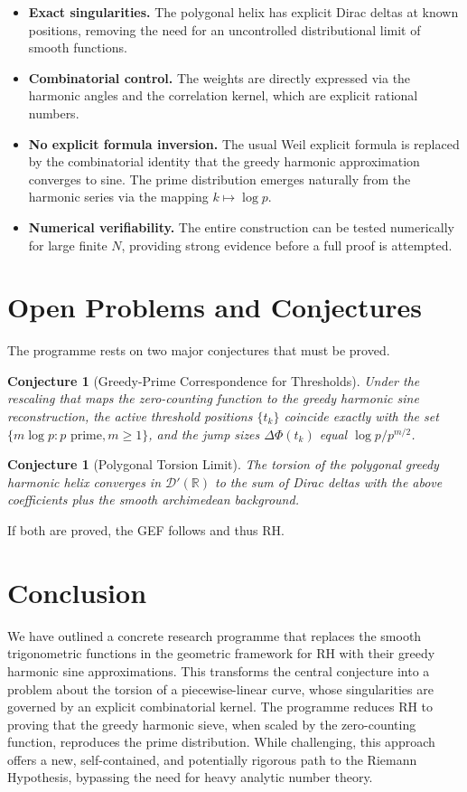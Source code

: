 \documentclass[12pt,a4paper]{article}
\newtheorem{conjecture}[theorem]{Conjecture}
\newcommand{\R}{\mathbb{R}}
\newcommand{\dist}{\mathcal{D}'}
\begin{document}
\begin{itemize}
\item \textbf{Exact singularities.}  The polygonal helix has explicit Dirac deltas at known positions, removing the need for an uncontrolled distributional limit of smooth functions.
\item \textbf{Combinatorial control.}  The weights are directly expressed via the harmonic angles and the correlation kernel, which are explicit rational numbers.
\item \textbf{No explicit formula inversion.}  The usual Weil explicit formula is replaced by the combinatorial identity that the greedy harmonic approximation converges to sine.  The prime distribution emerges naturally from the harmonic series via the mapping \(k\mapsto\log p\).
\item \textbf{Numerical verifiability.}  The entire construction can be tested numerically for large finite \(N\), providing strong evidence before a full proof is attempted.
\end{itemize}

\section{Open Problems and Conjectures}

The programme rests on two major conjectures that must be proved.

\begin{conjecture}[Greedy-Prime Correspondence for Thresholds]
Under the rescaling that maps the zero-counting function to the greedy harmonic sine reconstruction, the active threshold positions \(\{t_k\}\) coincide exactly with the set \(\{m\log p : p\text{ prime}, m\ge1\}\), and the jump sizes \(\Delta\Phi(t_k)\) equal \(\log p/p^{m/2}\).
\end{conjecture}

\begin{conjecture}[Polygonal Torsion Limit]
The torsion of the polygonal greedy harmonic helix converges in \(\dist(\R)\) to the sum of Dirac deltas with the above coefficients plus the smooth archimedean background.
\end{conjecture}

If both are proved, the GEF follows and thus RH.

\section{Conclusion}
We have outlined a concrete research programme that replaces the smooth trigonometric functions in the geometric framework for RH with their greedy harmonic sine approximations.  This transforms the central conjecture into a problem about the torsion of a piecewise-linear curve, whose singularities are governed by an explicit combinatorial kernel.  The programme reduces RH to proving that the greedy harmonic sieve, when scaled by the zero-counting function, reproduces the prime distribution.  While challenging, this approach offers a new, self-contained, and potentially rigorous path to the Riemann Hypothesis, bypassing the need for heavy analytic number theory.
\end{document}
